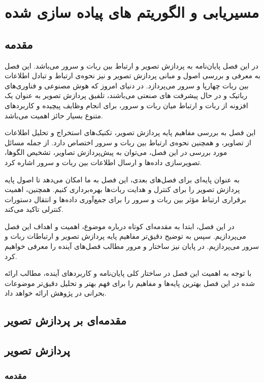 \chapter{مسیریابی و الگوریتم های پیاده سازی شده}

\section{مقدمه}

در این فصل پایان‌نامه به پردازش تصویر و ارتباط بین ربات و سرور می‌باشد. این فصل به معرفی و بررسی اصول و مبانی پردازش تصویر و نیز نحوه‌ی ارتباط و تبادل اطلاعات بین ربات چهارپا و سرور می‌پردازد. در دنیای امروز که هوش مصنوعی و فناوری‌های رباتیک و در حال پیشرفت های صنعتی می‌باشند، تلفیق پردازش تصویر به عنوان یک افزونه از ربات و ارتباط میان ربات و سرور، برای انجام وظایف پیچیده و کاربردهای متنوع بسیار حائز اهمیت می‌باشد.

این فصل به بررسی مفاهیم پایه پردازش تصویر، تکنیک‌های استخراج و تحلیل اطلاعات از تصاویر، و همچنین نحوه‌ی ارتباط بین ربات و سرور اختصاص دارد. از جمله مسائل مورد بررسی در این فصل، می‌توان به پیش‌پردازش تصاویر، تشخیص الگوها، تصویرسازی داده‌ها و ارسال اطلاعات بین ربات و سرور اشاره کرد.

به عنوان پایه‌ای برای فصل‌های بعدی، این فصل به ما امکان می‌دهد تا اصول پایه پردازش تصویر را برای کنترل و هدایت ربات‌ها بهره‌برداری کنیم. همچنین، اهمیت برقراری ارتباط مؤثر بین ربات و سرور را برای جمع‌آوری داده‌ها و انتقال دستورات کنترلی تاکید می‌کند.

در این فصل، ابتدا به مقدمه‌ای کوتاه درباره موضوع، اهمیت و اهداف این فصل می‌پردازیم. سپس به توضیح دقیق‌تر مفاهیم پایه پردازش تصویر و ارتباطات ربات و سرور می‌پردازیم. در پایان نیز ساختار و مرور مطالب فصل‌های آینده را معرفی خواهیم کرد.

با توجه به اهمیت این فصل در ساختار کلی پایان‌نامه و کاربردهای آینده، مطالب ارائه شده در این فصل بهترین پایه‌ها و مفاهیم را برای فهم بهتر و تحلیل دقیق‌تر موضوعات بحرانی در پژوهش ارائه خواهد داد.
\section{مقدمه‌ای بر پردازش تصویر}
\section{پردازش تصویر}
\subsection{مقدمه}

